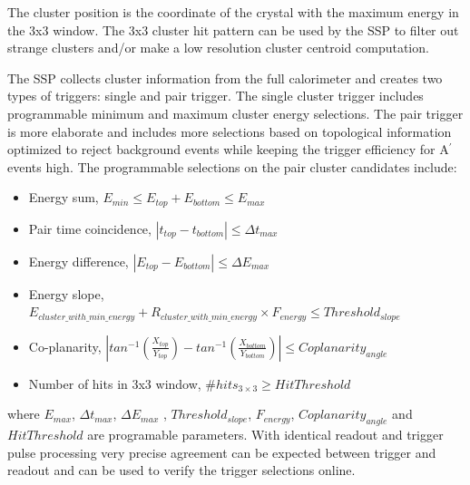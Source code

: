 The cluster position is the coordinate of the crystal with the maximum energy in the 3x3 window. The 3x3 cluster hit pattern can be used by the SSP to filter out strange clusters and/or make a low resolution cluster centroid computation.






The SSP collects cluster information from the full calorimeter and creates two types of triggers: single and pair trigger. The single cluster trigger includes programmable minimum and maximum cluster energy selections. The pair trigger is more elaborate and includes more selections based on topological information optimized to reject background events while keeping the trigger efficiency for A$^{\prime}$ events high. The programmable selections on the pair cluster candidates include:
\begin{itemize}
\item Energy sum,  
$E_{min}\le E_{top}+E_{bottom}\le E_{max}$
\item Pair time coincidence, 
$|t_{top}-t_{bottom}|\le \Delta t_{max}$ 
\item Energy difference, 
$|E_{top}-E_{bottom}|\le \Delta E_{max}$ 
\item Energy slope,
$E_{cluster\_with\_min\_energy}+R_{cluster\_with\_min\_energy}\times F_{energy}\le Threshold_{slope}$
\item Co-planarity, 
$|
tan^{-1}(\frac{X_{top}}{Y_{top}})-
tan^{-1}(\frac{X_{bottom}}{Y_{bottom}}) |\le Coplanarity_{angle}$
\item Number of hits in 3x3 window, 
\#$hits_{3\times 3}\ge HitThreshold$
\end{itemize}
\noindent
where $ E_{max}$,  $\Delta t_{max}$, $ \Delta E_{max}$ , $Threshold_{slope}$, 
$F_{energy}$, $Coplanarity_{angle}$
and
$HitThreshold$ are programable parameters.
With identical readout and trigger pulse processing very precise agreement can be expected between trigger and readout and can be used to verify the trigger selections online.





